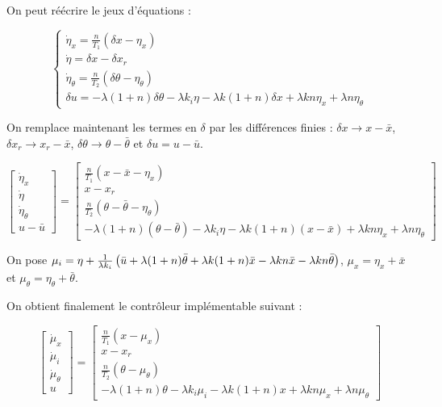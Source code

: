 \documentclass[10pt]{article}
\begin{document}
\noindent On peut réécrire le jeux d'équations :

\[
	\begin{cases}
		\dot \eta_x = \frac{n}{T_1} ( \delta x - \eta_x ) \\
		\dot \eta = \delta x - \delta x_r \\
		\dot \eta_\theta = \frac{n}{T_2} ( \delta \theta - \eta_\theta ) \\
		\delta u = - \lambda ( 1 + n ) \delta \theta - \lambda k_i \eta -  \lambda k (1 + n) \delta x +
		\lambda k n \eta_x + \lambda n \eta_\theta
	\end{cases}
\]

\noindent On remplace maintenant les termes en $\delta$ par les différences finies : $\delta x \to x - \bar x$,
$\delta x_r \to x_r - \bar x$, $\delta \theta \to \theta - \bar \theta$ et $\delta u = u - \bar u$.

\[
	\begin{bmatrix}
		\dot \eta_x \\
		\dot \eta \\
		\dot \eta_\theta \\
		u - \bar u
	\end{bmatrix}
	= \begin{bmatrix}
		\frac{n}{T_1} ( x - \bar x - \eta_x ) \\
		x - x_r \\
		\frac{n}{T_2} ( \theta - \bar \theta - \eta_\theta ) \\
		- \lambda ( 1 + n ) ( \theta - \bar \theta ) - \lambda k_i \eta - \lambda k (1 + n) ( x - \bar x ) +
		\lambda k n \eta_x + \lambda n \eta_\theta
	\end{bmatrix}
\]

\noindent On pose  $\mu_i = \eta + \frac{1}{\lambda k_i} \left( \bar u +
\lambda (1 + n) \bar \theta + \lambda k (1 + n) \bar x - \lambda k n \bar x -
\lambda k n \bar \theta \right)$, $\mu_x = \eta_x + \bar x$ et $\mu_\theta = \eta_\theta + \bar \theta$.

\noindent On obtient finalement le contrôleur implémentable suivant :

\[
	\begin{bmatrix}
		\dot \mu_x \\
		\dot \mu_i \\
		\dot \mu_\theta \\
		u
	\end{bmatrix}
	= \begin{bmatrix}
		\frac{n}{T_1} ( x - \mu_x ) \\
		x - x_r \\
		\frac{n}{T_2} ( \theta - \mu_\theta ) \\
		- \lambda ( 1 + n ) \theta - \lambda k_i \mu_i - \lambda k (1 + n) x + \lambda k n \mu_x + \lambda n \mu_\theta
	\end{bmatrix}
\]
\end{document}
